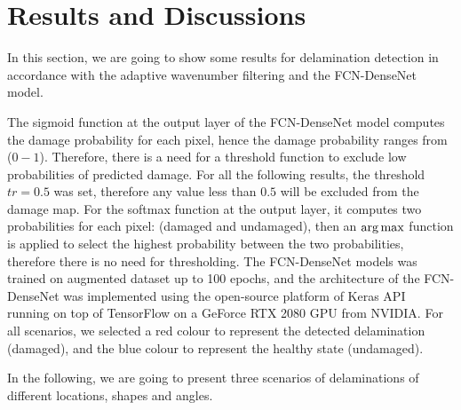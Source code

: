 \section{Results and Discussions}
In this section, we are going to show some results for delamination detection in accordance with the adaptive wavenumber filtering and the FCN-DenseNet model. 

The sigmoid function at the output layer of the FCN-DenseNet model computes the damage probability for each pixel, hence the damage probability ranges from (\(0 - 1\)).
Therefore, there is a need for a threshold function to exclude low probabilities of predicted damage. 
For all the following results, the threshold \(tr = 0.5\) was set, therefore any value less than \(0.5\) will be excluded from the damage map.
For the softmax function at the output layer, it computes two probabilities for each pixel: (damaged and undamaged), then an \(\operatorname*{arg\,max}\) function is applied to select the highest probability between the two probabilities, therefore there is no need for thresholding. 
The FCN-DenseNet models was trained on augmented dataset up to 100 epochs, and the architecture of the FCN-DenseNet  was implemented using the open-source platform of Keras API~\cite{chollet2015keras} running on top of TensorFlow on a GeForce RTX 2080  GPU from NVIDIA.
For all scenarios, we selected a red colour to represent the detected delamination (damaged), and the blue colour to represent the healthy state (undamaged).

In the following, we are going to present three scenarios of delaminations of different locations, shapes and angles.

